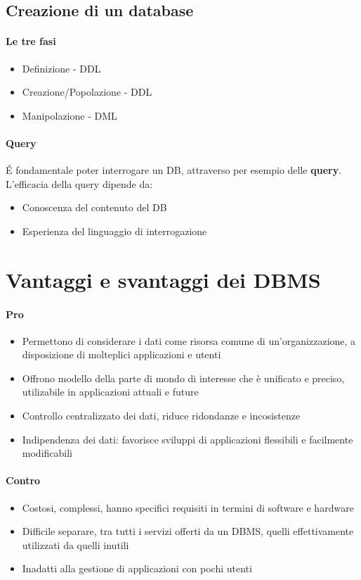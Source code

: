 \subsection{Creazione di un database}
\paragraph*{Le tre fasi}
\begin{itemize}
    \item Definizione - DDL
    \item Creazione/Popolazione - DDL
    \item Manipolazione - DML
\end{itemize}

\paragraph*{Query}
\'E fondamentale poter interrogare un DB, attraverso per esempio delle \textbf{query}.
L'efficacia della query dipende da:
\begin{itemize}
    \item Conoscenza del contenuto del DB
    \item Esperienza del linguaggio di interrogazione
\end{itemize}

\section{Vantaggi e svantaggi dei DBMS}
\paragraph*{Pro}
\begin{itemize}
    \item Permettono di considerare i dati come risorsa comune di un'organizzazione,
    a disposizione di molteplici applicazioni e utenti
    \item Offrono modello della parte di mondo di interesse che è unificato e preciso,
    utilizabile in applicazioni attuali e future
    \item Controllo centralizzato dei dati, riduce ridondanze e incosistenze
    \item Indipendenza dei dati: favorisce sviluppi di applicazioni flessibili e
    facilmente modificabili
\end{itemize}
\paragraph*{Contro}
\begin{itemize}
    \item Costosi, complessi, hanno specifici requisiti in termini di software e hardware
    \item Difficile separare, tra tutti i servizi offerti da un DBMS, quelli effettivamente
    utilizzati da quelli inutili
    \item Inadatti alla gestione di applicazioni con pochi utenti
\end{itemize}